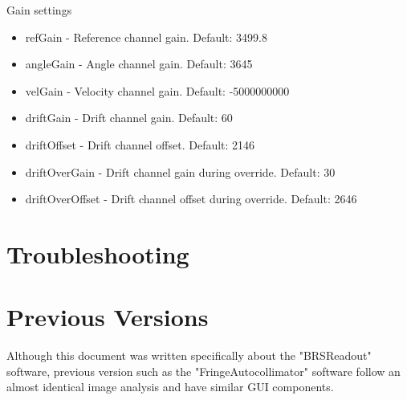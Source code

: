 \documentclass{article}
\begin{document}
Gain settings
\begin{itemize}
\item refGain - Reference channel gain. Default: 3499.8
\item angleGain - Angle channel gain. Default: 3645
\item velGain - Velocity channel gain. Default: -5000000000
\item driftGain - Drift channel gain. Default: 60
\item driftOffset - Drift channel offset. Default: 2146
\item driftOverGain - Drift channel gain during override. Default: 30
\item driftOverOffset - Drift channel offset during override. Default: 2646
\end{itemize}

\section{Troubleshooting}
\section{Previous Versions}
Although this document was written specifically about the "BRSReadout" software, previous version such as the "FringeAutocollimator" software follow an almost identical image analysis and have similar GUI components.

{}
\end{document}
